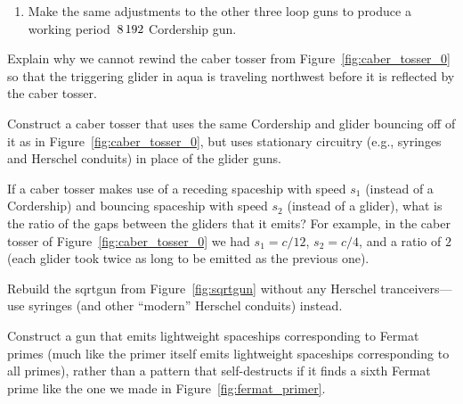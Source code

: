 \begin{multicols}{2}
\begin{problem}
\begin{enumerate}[label=\bf\color{ocre}(\alph*)]
			\item {} Make the same adjustments to the other three loop guns to produce a working period~$8{\,}192$ Cordership gun.
		\end{enumerate}
	\end{problem}
	
	
	\mfilbreak
	
	
	\begin{problem}\label{exer:caber_tosser_rewind} 
		Explain why we cannot rewind the caber tosser from Figure~\ref{fig:caber_tosser_0} so that the triggering glider in aqua is traveling northwest before it is reflected by the caber tosser.
	\end{problem}
	
	
	\mfilbreak
	
	
	\begin{problem}\label{exer:caber_tosser_stationary} 
		Construct a caber tosser that uses the same Cordership and glider bouncing off of it as in Figure~\ref{fig:caber_tosser_0}, but uses stationary circuitry (e.g., syringes and Herschel conduits) in place of the glider guns.
	\end{problem}
	
	
	\mfilbreak
	
	
	\begin{problem}\label{exer:caber_tosser_different_speeds} 
		If a caber tosser makes use of a receding spaceship with speed $s_1$ (instead of a Cordership) and bouncing spaceship with speed $s_2$ (instead of a glider), what is the ratio of the gaps between the gliders that it emits? For example, in the caber tosser of Figure~\ref{fig:caber_tosser_0} we had $s_1 = c/12$, $s_2 = c/4$, and a ratio of $2$ (each glider took twice as long to be emitted as the previous one).
	\end{problem}
	
	
	\mfilbreak
	
	
	\begin{problem}\label{exer:sqrtgun_standard} 
		Rebuild the sqrtgun from Figure~\ref{fig:sqrtgun} without any Herschel tranceivers---use syringes (and other ``modern'' Herschel conduits) instead.
	\end{problem}
	
	
	\mfilbreak
	
	
	\begin{problem}\label{exer:construct_fermat_primer} 
		Construct a gun that emits lightweight spaceships corresponding to Fermat primes (much like the primer itself emits lightweight spaceships corresponding to all primes), rather than a pattern that self-destructs if it finds a sixth Fermat prime like the one we made in Figure~\ref{fig:fermat_primer}.
	\end{problem}
	

\end{multicols}
